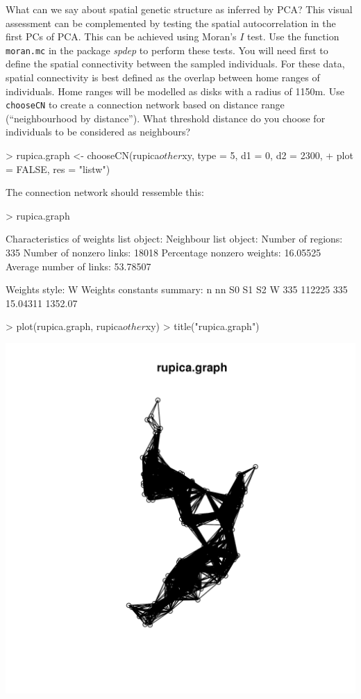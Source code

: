 \documentclass{article}
\begin{document}
\noindent What can we say about spatial genetic structure as inferred by PCA?
This visual assessment can be complemented by testing the spatial autocorrelation in the first PCs
of PCA.
This can be achieved using Moran's $I$ test.
Use the function \texttt{moran.mc} in the package \emph{spdep} to perform these tests.
You will need first to define the spatial connectivity between the sampled individuals.
For these data, spatial connectivity is best defined as the overlap between home ranges of
individuals.
Home ranges will be modelled as disks with a radius of 1150m.
Use \texttt{chooseCN} to create a connection network based on distance range (``neighbourhood by
distance'').
What threshold distance do you choose for individuals to be considered as neighbours?
\begin{Schunk}
\begin{Sinput}
> rupica.graph <- chooseCN(rupica$other$xy, type = 5, d1 = 0, d2 = 2300, 
+     plot = FALSE, res = "listw")
\end{Sinput}
\end{Schunk}
The connection network should ressemble this:
\begin{Schunk}
\begin{Sinput}
> rupica.graph
\end{Sinput}
\begin{Soutput}
Characteristics of weights list object:
Neighbour list object:
Number of regions: 335 
Number of nonzero links: 18018 
Percentage nonzero weights: 16.05525 
Average number of links: 53.78507 

Weights style: W 
Weights constants summary:
    n     nn  S0       S1      S2
W 335 112225 335 15.04311 1352.07
\end{Soutput}
\begin{Sinput}
> plot(rupica.graph, rupica$other$xy)
> title("rupica.graph")
\end{Sinput}
\end{Schunk}
\includegraphics{figs/spca-037}
\end{document}
